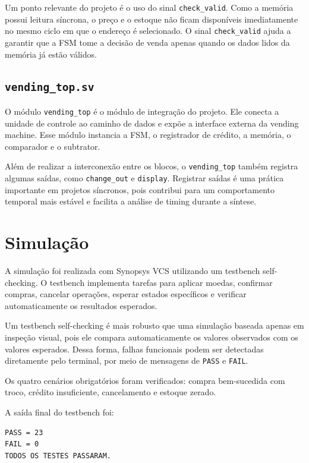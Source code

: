 \documentclass[11pt,a4paper]{article}
\begin{document}
Um ponto relevante do projeto é o uso do sinal \texttt{check\_valid}. Como a memória possui leitura síncrona, o preço e o estoque não ficam disponíveis imediatamente no mesmo ciclo em que o endereço é selecionado. O sinal \texttt{check\_valid} ajuda a garantir que a FSM tome a decisão de venda apenas quando os dados lidos da memória já estão válidos.

\subsection{\texttt{vending\_top.sv}}

O módulo \texttt{vending\_top} é o módulo de integração do projeto. Ele conecta a unidade de controle ao caminho de dados e expõe a interface externa da vending machine. Esse módulo instancia a FSM, o registrador de crédito, a memória, o comparador e o subtrator.

Além de realizar a interconexão entre os blocos, o \texttt{vending\_top} também registra algumas saídas, como \texttt{change\_out} e \texttt{display}. Registrar saídas é uma prática importante em projetos síncronos, pois contribui para um comportamento temporal mais estável e facilita a análise de timing durante a síntese.

\section{Simulação}

A simulação foi realizada com Synopsys VCS utilizando um testbench self-checking. O testbench implementa tarefas para aplicar moedas, confirmar compras, cancelar operações, esperar estados específicos e verificar automaticamente os resultados esperados.

Um testbench self-checking é mais robusto que uma simulação baseada apenas em inspeção visual, pois ele compara automaticamente os valores observados com os valores esperados. Dessa forma, falhas funcionais podem ser detectadas diretamente pelo terminal, por meio de mensagens de \texttt{PASS} e \texttt{FAIL}.

Os quatro cenários obrigatórios foram verificados: compra bem-sucedida com troco, crédito insuficiente, cancelamento e estoque zerado.

A saída final do testbench foi:

\begin{lstlisting}
PASS = 23
FAIL = 0
TODOS OS TESTES PASSARAM.
\end{lstlisting}
\end{document}
